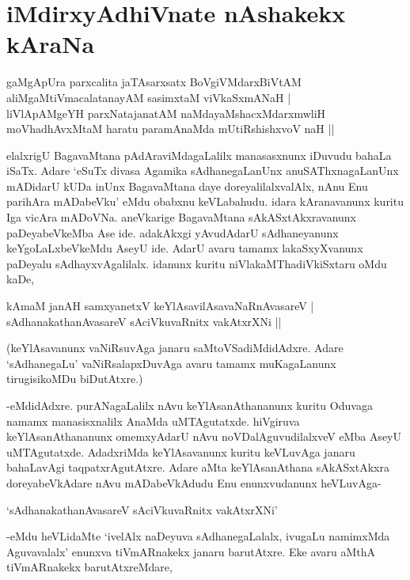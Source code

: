 \chapter{iMdirxyAdhiVnate nAshakekx kAraNa}\label{chap10}

\begin{shloka}
gaMgApUra parxcalita jaTAsarxsatx BoVgiVMdarxBiVtAM\\
aliMgaMtiVmacalatanayAM sasimxtaM viVkaSxmANaH |\\
liVlApAMgeYH parxNatajanatAM naMdayaMshacxMdarxmwliH\\
moVhadhAvxMtaM haratu paramAnaMda mUtiRshishxvoV naH ||
\end{shloka}

elalxrigU BagavaMtana pAdAraviMdagaLalilx manasasxnunx iDuvudu bahaLa iSaTx. Adare `eSuTx divasa Agamika sAdhanegaLanUnx anuSAThxnagaLanUnx mADidarU kUDa inUnx BagavaMtana daye doreyalilalxvalAlx, nAnu Enu parihAra mADabeVku' eMdu obabxnu keVLabahudu. idara kAranavanunx kuritu Iga vicAra mADoVNa. aneVkarige BagavaMtana sAkASxtAkxravanunx paDeyabeVkeMba Ase ide. adakAkxgi yAvudAdarU sAdhaneyanunx keYgoLaLxbeVkeMdu AseyU ide. AdarU avaru tamamx lakaSxyXvanunx paDeyalu sAdhayxvAgalilalx. idanunx kuritu niVlakaMThadiVkiSxtaru oMdu kaDe,

\begin{shloka}
kAmaM janAH samxyanetxV keYlAsavilAsavaNaRnAvasareV |\\
sAdhanakathanAvasareV sAciVkuvaRnitx vakAtxrXNi ||
\end{shloka}

(keYlAsavanunx vaNiRsuvAga janaru saMtoVSadiMdidAdxre. Adare `sAdhanegaLu' vaNiRsalapxDuvAga avaru tamamx muKagaLanunx tirugisikoMDu biDutAtxre.)

-eMdidAdxre. purANagaLalilx nAvu keYlAsanAthananunx kuritu Oduvaga namamx manasisxnalilx AnaMda uMTAgutatxde. hiVgiruva keYlAsanAthananunx omemxyAdarU nAvu noVDalAguvudilalxveV eMba AseyU uMTAgutatxde. AdadxriMda keYlAsavanunx kuritu keVLuvAga janaru bahaLavAgi taqpatxrAgutAtxre. Adare aMta keYlAsanAthana sAkASxtAkxra doreyabeVkAdare nAvu mADabeVkAdudu Enu enunxvudanunx heVLuvAga-

\begin{shloka}
`sAdhanakathanAvasareV sAciVkuvaRnitx vakAtxrXNi'
\end{shloka}

-eMdu heVLidaMte `ivelAlx naDeyuva sAdhanegaLalalx, ivugaLu namimxMda Aguvavalalx' enunxva tiVmARnakekx janaru barutAtxre. Eke avaru aMthA tiVmARnakekx barutAtxreMdare,

